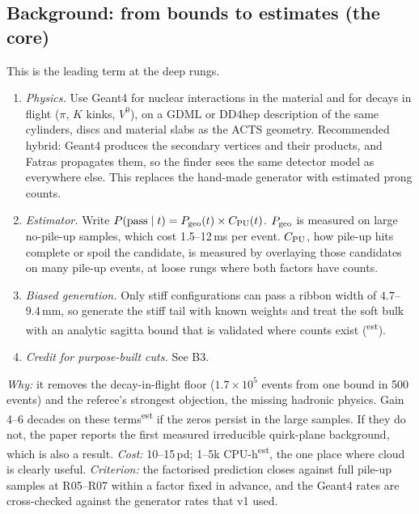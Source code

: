 \documentclass[11pt,a4paper]{article}
\newcommand{\EST}{\textsuperscript{\textsf{est}}}
\newcommand{\must}{\textsf{\textbf{Must}}}
\begin{document}
\subsection{Background: from bounds to estimates (the core)}
\begin{description}[leftmargin=0pt,style=unboxed]
\item[B1 \must{} Single-interaction topologies with real hadronic physics and a factorised estimator.]
  This is the leading term at the deep rungs.
  \begin{enumerate}
    \item \emph{Physics.} Use Geant4 for nuclear interactions in the material and for decays in flight ($\pi$, $K$ kinks,
          $V^0$), on a GDML or DD4hep description of the same cylinders, discs and material slabs as the ACTS geometry.
          Recommended hybrid: Geant4 produces the secondary vertices and their products, and Fatras propagates them, so
          the finder sees the same detector model as everywhere else. This replaces the hand-made generator with
          estimated prong counts.
    \item \emph{Estimator.} Write $P({\rm pass}\mid t)=P_{\rm geo}(t)\times C_{\rm PU}(t)$. $P_{\rm geo}$ is measured on large
          no-pile-up samples, which cost 1.5--12\,ms per event. $C_{\rm PU}$, how pile-up hits complete or spoil the
          candidate, is measured by overlaying those candidates on many pile-up events, at loose rungs where both
          factors have counts.
    \item \emph{Biased generation.} Only stiff configurations can pass a ribbon width of $4.7$--$9.4$\,mm, so generate
          the stiff tail with known weights and treat the soft bulk with an analytic sagitta bound that is validated
          where counts exist (\EST).
    \item \emph{Credit for purpose-built cuts.} See B3.
  \end{enumerate}
  \emph{Why:} it removes the decay-in-flight floor ($1.7\times10^5$ events from one bound in 500 events) and the
  referee's strongest objection, the missing hadronic physics. Gain 4--6 decades on these terms\EST{} if the zeros persist
  in the large samples. If they do not, the paper reports the first measured irreducible quirk-plane background, which is
  also a result. \emph{Cost:} 10--15\,pd; 1--5k CPU-h\EST, the one place where cloud is clearly useful.
  \emph{Criterion:} the factorised prediction closes against full pile-up samples at R05--R07 within a factor fixed in
  advance, and the Geant4 rates are cross-checked against the generator rates that v1 used.


\end{description}
\end{document}
